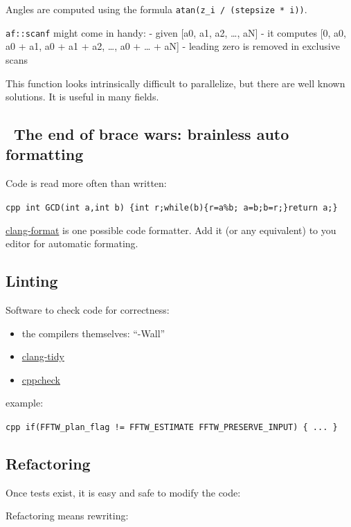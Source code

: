 Angles are computed using the formula
\texttt{atan(z\_i / (stepsize * i))}.

\texttt{af::scanf} might come in handy: - given {[}a0, a1, a2, \ldots{},
aN{]} - it computes {[}0, a0, a0 + a1, a0 + a1 + a2, \ldots{}, a0 +
\ldots{} + aN{]} - leading zero is removed in exclusive scans

This function looks intrinsically difficult to parallelize, but there
are well known solutions. It is useful in many fields.

\subsection{~The end of brace wars: brainless auto
formatting}\label{the-end-of-brace-wars-brainless-auto-formatting}

Code is read more often than written:

\texttt{cpp int GCD(int a,int b) \{int r;while(b)\{r=a\%b;   a=b;b=r;\}return a;\}}

\href{https://clang.llvm.org/docs/ClangFormat.html}{clang-format} is one
possible code formatter. Add it (or any equivalent) to you editor for
automatic formating.

\subsection{Linting}\label{linting}

Software to check code for correctness:

\begin{itemize}
\itemsep1pt\parskip0pt
\item
  the compilers themselves: ``-Wall''
\item
  \href{http://clang.llvm.org/extra/clang-tidy/}{clang-tidy}
\item
  \href{http://cppcheck.sourceforge.net/}{cppcheck}
\end{itemize}

example:

\texttt{cpp   if(FFTW\_plan\_flag != FFTW\_ESTIMATE \textbar{} FFTW\_PRESERVE\_INPUT) \{     ...   \}}

\subsection{Refactoring}\label{refactoring}

Once tests exist, it is easy and safe to modify the code:

Refactoring means rewriting:

